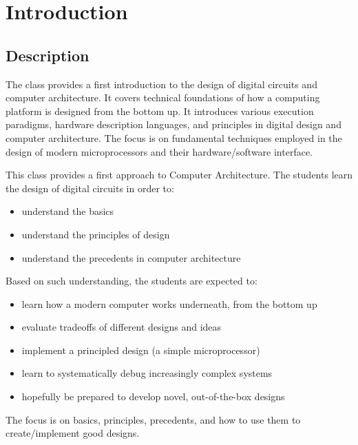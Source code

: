 \chapter{Introduction}
\section{Description}

The class provides a first introduction to the design of digital circuits and 
computer architecture. It covers technical foundations of how a computing platform 
is designed from the bottom up. It introduces various execution paradigms, hardware 
description languages, and principles in digital design and computer architecture. 
The focus is on fundamental techniques employed in the design of modern microprocessors 
and their hardware/software interface.
\bigskip

\begin{satz}[Overview]
    This class provides a first approach to Computer Architecture. The students learn the
    design of digital circuits in order to:
    \begin{itemize}
        \item understand the basics
        \item understand the principles of design
        \item understand the precedents in computer architecture
    \end{itemize}
\tcblower
    Based on such understanding, the students are expected to:
    \begin{itemize}
        \item learn how a modern computer works underneath, from the bottom up
        \item evaluate tradeoffs of different designs and ideas
        \item implement a principled design (a simple microprocessor) 
        \item learn to systematically debug increasingly complex systems
        \item hopefully be prepared to develop novel, out-of-the-box designs
    \end{itemize}
    
\end{satz}
\bigskip

The focus is on basics, principles, precedents, and how to use them to 
create/implement good designs.